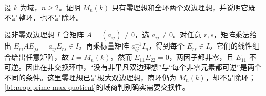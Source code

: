 \begin{exercise}\label{b1:ex:10-matrix-ideals}
	设 \(k\) 为域，\(n\geq2\)。证明 \(M_n(k)\) 只有零理想和全环两个双边理想，并说明它既不是整环，也不是除环。
\end{exercise}
\begin{solution}
	设非零双边理想 \(I\) 含矩阵 \(A=(a_{ij})\ne0\)，选 \(a_{ij}\ne0\)。对任意 \(r,s\)，矩阵乘法给出 \(E_{ri}AE_{js}=a_{ij}E_{rs}\in I\)。再乘标量矩阵 \(a_{ij}^{-1}I_n\)，得到每个 \(E_{rs}\in I\)。它们的线性组合给出任意矩阵，故 \(I=M_n(k)\)。然而 \(E_{11}E_{22}=0\)，两因子都非零，且 \(E_{11}\) 不可逆。因此在非交换环中，“没有非平凡双边理想”与“每个非零元素都可逆”是两个不同的条件。这里零理想已是极大双边理想，商环仍为 \(M_n(k)\)，却不是除环；\cref{b1:prop:prime-max-quotient}的域商判别确实需要交换性。
\end{solution}

